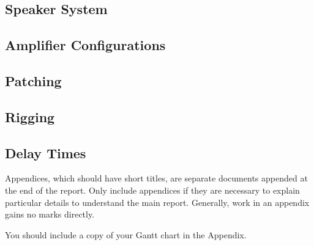 \documentclass{BCUReport}
\begin{document}


\clearpage



\begin{appendices}
    \section{Speaker System}
        \subsection{Amplifier Configurations}
            \label{appendix:speaker_amp_config}
            
    
        \subsection{Patching}
            \label{appendix:speaker_patch}
            
        
        \subsection{Rigging}
            \label{appendix:speaker_rigging}
            
        
            \subsection{Delay Times}
            \label{appendix:speaker_delays}
            


    Appendices, which should have short titles, are separate documents appended at the end of the report. Only include appendices if they are necessary to explain particular details to understand the main report. Generally, work in an appendix gains no marks directly.
        
    You should include a copy of your Gantt chart in the Appendix.
        

\end{appendices}
\end{document}
